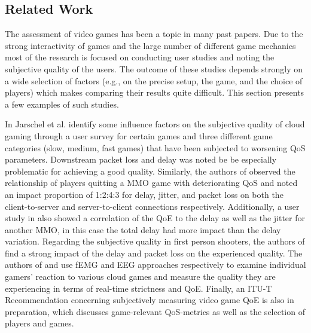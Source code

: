 \subsection{Related Work}

The assessment of video games has been a topic in many past papers. Due to the strong interactivity of games and the large number of different game mechanics most of the research is focused on conducting user studies and noting the subjective quality of the users. The outcome of these studies depends strongly on a wide selection of factors (e.g., on the precise setup, the game, and the choice of players) which makes comparing their results quite difficult. This section presents a few examples of such studies.

In \cite{5976180} Jarschel et al. identify some influence factors on the subjective quality of cloud gaming through a user survey for certain games and three different game categories (slow, medium, fast games) that have been subjected to worsening \gls{QoS} parameters. Downstream packet loss and delay was noted be be especially problematic for achieving a good quality. Similarly, the authors of \cite{4591393} observed the relationship of players quitting a \gls{MMO} game with deteriorating \gls{QoS} and noted an impact proportion of 1:2:4:3 for delay, jitter, and packet loss on both the client-to-server and server-to-client connections respectively. Additionally, a user study in \cite{4604397} also showed a correlation of the \gls{QoE} to the delay as well as the jitter for another \gls{MMO}, in this case the total delay had more impact than the delay variation. Regarding the subjective quality in first person shooters, the authors of \cite{6614351} find a strong impact of the delay and packet loss on the experienced quality. The authors of \cite{6404025} and \cite{beyerusing} use \gls{fEMG} and \gls{EEG} approaches respectively to examine individual gamers' reaction to various cloud games and measure the quality they are experiencing in terms of real-time strictness and \gls{QoE}. Finally, an ITU-T Recommendation \cite{mollertowards} concerning subjectively measuring video game \gls{QoE} is also in preparation, which discusses game-relevant \gls{QoS}-metrics as well as the selection of players and games.

